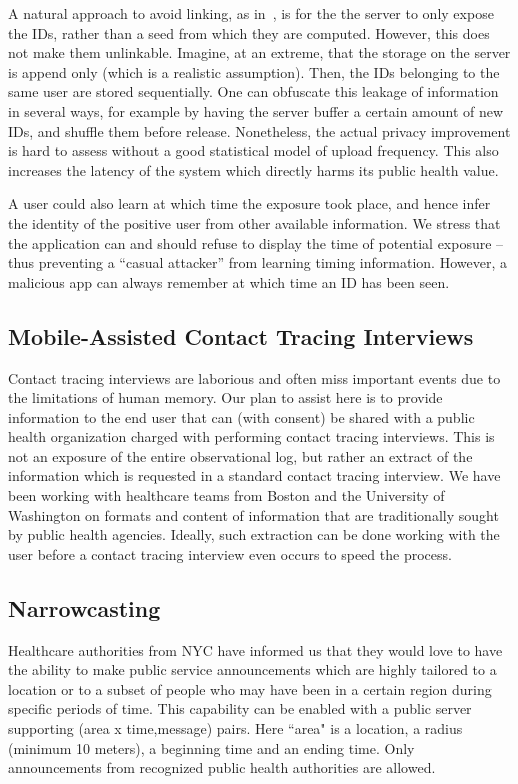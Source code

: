 A natural approach to avoid linking, as in~\cite{BU}, is for the the server to only expose the IDs, rather than a seed from which they are computed. However, this does not make them unlinkable. Imagine, at an extreme, that the storage on the server is append only (which is a realistic assumption). Then, the IDs belonging to the same user are stored sequentially. One can obfuscate this leakage of information in several ways, for example by having the server buffer a certain amount of new IDs, and shuffle them before release. Nonetheless, the actual privacy improvement is hard to assess without a good statistical model of upload frequency. This also increases the latency of the system which directly harms its public health value.

A user could also learn at which time the exposure took place, and hence infer the identity of the positive user from other available information. We stress that the application can and should refuse to display the time of potential exposure -- thus preventing a ``casual attacker'' from learning timing information. However, a malicious app can always remember at which time an ID has been seen.


\subsection{Mobile-Assisted Contact Tracing Interviews} 
Contact tracing interviews are laborious and often miss important events due to the limitations of human memory.  Our plan to assist here is to provide information to the end user that can (with consent) be shared with a public health organization charged with performing contact tracing interviews.  This is not an exposure of the entire observational log, but rather an extract of the information which is requested in a standard contact tracing interview. We have been working with healthcare teams from Boston and the University of Washington on formats and content of information that are traditionally sought by public health agencies.  Ideally, such extraction can be done working with the user before a contact tracing interview even occurs to speed the process.

\subsection{Narrowcasting}

Healthcare authorities from NYC have informed us that they would love to have the ability to make public service announcements which are highly tailored to a location or to a subset of people who may have been in a certain region during specific periods of time.  This capability can be enabled with a public server supporting (area x time,message) pairs.  Here ``area" is a location, a radius (minimum 10 meters), a beginning time and an ending time.  Only announcements from recognized public health authorities are allowed.  

